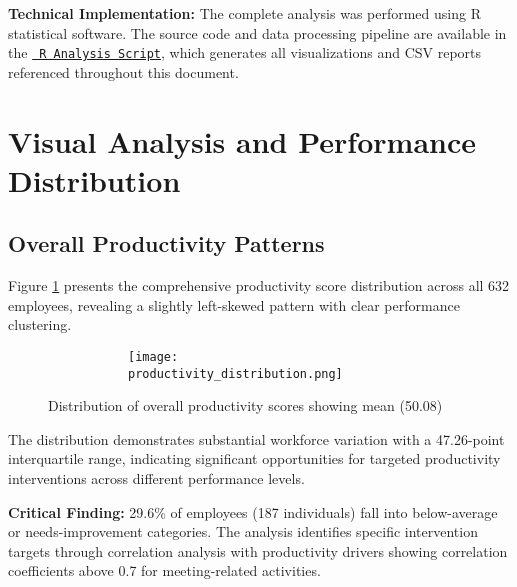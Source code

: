 \documentclass[12pt,a4paper]{article}
\begin{document}
\textbf{Technical Implementation:} 
The complete analysis was performed using R statistical software. The source code and data processing pipeline are available in the \href{https://fixysaskihumorizijuv.supabase.co/storage/v1/object/public/research-files/baf34d6e-b23f-4eaa-b529-571185a1127b-R%20Script.R?download=}{\texttt{ R Analysis Script}}, 
which generates all visualizations and CSV reports referenced throughout this document.



\newpage
\section{Visual Analysis and Performance Distribution}

\subsection{Overall Productivity Patterns}

Figure \ref{fig:productivity_dist} presents the comprehensive productivity score distribution across all 632 employees, revealing a slightly left-skewed pattern with clear performance clustering.

\begin{figure}[H]
\centering
\begin{figure}
    \begin{center}
        
   
    \begin{figure}
        \centering
        \texttt{[image: productivity\_distribution.png]}
    \end{figure}
     \end{center}
\end{figure}


\caption{Distribution of overall productivity scores showing mean (50.08)}
\label{fig:productivity_dist}
\end{figure}

The distribution demonstrates substantial workforce variation with a 47.26-point interquartile range, indicating significant opportunities for targeted productivity interventions across different performance levels.

\begin{warningbox}
\textbf{Critical Finding:} 29.6\% of employees (187 individuals) fall into below-average or needs-improvement categories. The analysis identifies specific intervention targets through correlation analysis with productivity drivers showing correlation coefficients above 0.7 for meeting-related activities.
\end{warningbox}
\end{document}
